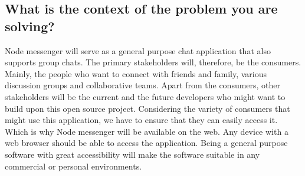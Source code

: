 \documentclass{article}
\begin{document}
	\subsection{What is the context of the problem you are solving?}
    
Node messenger will serve as a general purpose chat application that also supports group chats. The primary stakeholders will, therefore, be the consumers. Mainly, the people who want to connect with friends and family, various discussion groups and collaborative teams. Apart from the consumers, other stakeholders will be the current and the future developers who might want to build upon this open source project.
Considering the variety of consumers that might use this application, we have to ensure that they can easily access it. Which is why Node messenger will be available on the web. Any device with a web browser should be able to access the application. Being a general purpose software with great accessibility will make the software suitable in any commercial or personal environments.
\end{document}
